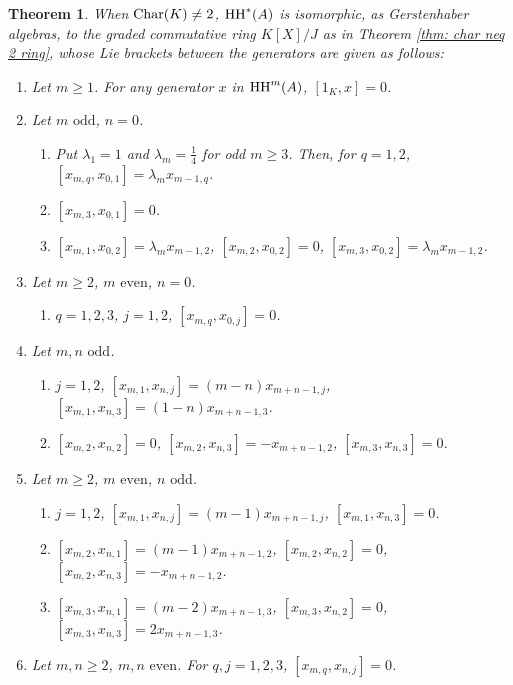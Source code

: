 \documentclass[10pt, reqno]{amsart}
\newtheorem{theorem}{Theorem}[section]
\theoremstyle{definition}
\theoremstyle{remark}
\numberwithin{equation}{section}
\begin{document}
\begin{theorem}   
\label{thm:  char not two Gerstenhaber bracket}
    When \( \mathrm{Char}(K) \neq 2\), \(\mathrm{HH}^*(A)\)  is isomorphic, as Gerstenhaber algebras,  to the graded commutative ring $K[X]/J$ as in Theorem \ref{thm: char neq 2 ring},  whose  Lie brackets between the   generators  are given as follows:  
    \begin{enumerate}
        \item Let \(m\ge 1\). For any generator $x$ in \(\mathrm{HH}^m(A)\), $[1_K, x]=0$.
        \item Let \(m \text{ odd}\), \(n = 0\). \begin{enumerate}
            \item Put $\lambda_1=1$ and $\lambda_m=\frac14$ for odd
            $m\ge3$. Then, for $q=1,2$, $[x_{m,q},x_{0,1}] =\lambda_m x_{m-1,q}$.
            \item $[x_{m,3},x_{0,1}] =0$. 
            \item $[x_{m,1},x_{0,2}] =\lambda_m x_{m-1,2}$, $[x_{m,2},x_{0,2}] =0$, $[x_{m,3},x_{0,2}] =\lambda_m x_{m-1,2}$. 
        \end{enumerate}
    \item Let \(m\ge 2\), \(m \text{ even}\),  \(n = 0\). \begin{enumerate}
        \item $q=1,2,3$, $j=1,2$, $[x_{m,q},x_{0,j}] =0$.
        \end{enumerate}
        \item Let \(m,n \text{ odd}\). \begin{enumerate}
            \item $j=1,2$, $[x_{m,1}, x_{n,j}] = (m-n)x_{m+n-1,j}$, $[x_{m,1}, x_{n,3}] =(1-n)x_{m+n-1,3}$.
           \item $ [x_{m,2}, x_{n,2}] =0$, $[x_{m,2}, x_{n,3}] =-x_{m+n-1,2}$, $[x_{m,3}, x_{n,3}] =0$.
        \end{enumerate}
        \item Let \(m\ge 2\), \(m \text{ even}\), \(n\text{ odd}\). \begin{enumerate}
            \item $j=1,2$, $[x_{m,1},x_{n,j}] = (m-1)x_{m+n-1,j}$, $[x_{m,1},x_{n,3}] = 0$.
            \item $[x_{m,2},x_{n,1}] = (m-1)x_{m+n-1,2}$, $[x_{m,2},x_{n,2}] = 0$, $[x_{m,2},x_{n,3}] = -x_{m+n-1,2}$.
           \item $[x_{m,3},x_{n,1}] = (m-2)x_{m+n-1,3}$, $[x_{m,3},x_{n,2}] =0$, $[x_{m,3},x_{n,3}] = 2x_{m+n-1,3}$.
        \end{enumerate}
        \item Let \(m,n\ge 2\), \(m,n \text{ even}\). For $q, j=1,2,3$, $[x_{m,q},x_{n,j}] = 0$.
    \end{enumerate}
\end{theorem}
\end{document}
